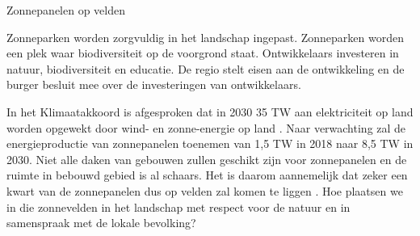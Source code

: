 \begin{voorstel}{Zonnepanelen op velden}


\begin{samenvatting}
Zonneparken worden zorgvuldig in het landschap ingepast. Zonneparken worden een plek waar biodiversiteit op de voorgrond staat. Ontwikkelaars investeren in natuur, biodiversiteit en educatie. De regio stelt eisen aan de ontwikkeling en de burger besluit mee over de investeringen van ontwikkelaars.
\end{samenvatting}

\begin{multicols}{2}

\begin{uitdaging}
In het Klimaatakkoord is afgesproken dat in 2030 35 TW aan elektriciteit op land worden opgewekt door wind- en zonne-energie op land \parencite{noauthor_klimaatakkoord_2019}. Naar verwachting zal de energieproductie van zonnepanelen toenemen van 1,5 TW in 2018 naar 8,5 TW in 2030. Niet alle daken van gebouwen zullen geschikt zijn voor zonnepanelen en de ruimte in bebouwd gebied is al schaars. Het is daarom aannemelijk dat zeker een kwart van de zonnepanelen dus op velden zal komen te liggen \parencite{nationaal_programma_res_factsheet_2019}. Hoe plaatsen we in die zonnevelden in het landschap met respect voor de natuur en in samenspraak met de lokale bevolking?
\end{uitdaging}

\begin{overwegingen}

\end{overwegingen}
\end{multicols}
\end{voorstel}
